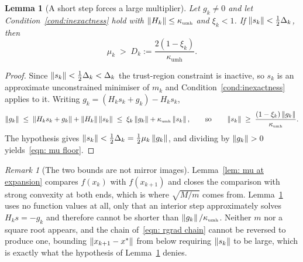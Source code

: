 \documentclass[11pt]{article}
\theoremstyle{plain}
\newtheorem{lemma}[theorem]{Lemma}
\theoremstyle{definition}
\theoremstyle{remark}
\newtheorem{remark}[theorem]{Remark}
\numberwithin{equation}{section}
\providecommand{\defeq}{\mathrel{:=}}
\newcommand*\mykappa[1]{\kappa_{\scriptscriptstyle\text{#1}}}
\begin{document}
\begin{lemma}[A short step forces a large multiplier]
\label{lem: mu at contraction}
    Let $g_k \neq 0$ and let Condition~\ref{cond:inexactness} hold with $\norm{H_k} \leq
    \mykappa{umh}$ and $\xi_k < 1$. If $\left \lVert s_k \right \rVert < \tfrac12\Delta_k$, then
    \begin{equation}
        \mu_k \;>\; D_k \defeq \frac{2(1-\xi_k)}{\mykappa{umh}} .
        \label{eqn: mu floor}
    \end{equation}
\end{lemma}

\begin{proof}
    Since $\left \lVert s_k \right \rVert < \tfrac12\Delta_k < \Delta_k$ the trust-region constraint is inactive, so
    $s_k$ is an approximate unconstrained minimiser of $m_k$ and
    Condition~\ref{cond:inexactness} applies to it. Writing
    $g_k = (H_k s_k + g_k) - H_k s_k$,
    \begin{equation*}
        \norm{g_k} \;\leq\; \norm{H_k s_k + g_k} + \norm{H_k}\norm{s_k}
                   \;\leq\; \xi_k\norm{g_k} + \mykappa{umh}\norm{s_k} ,
        \qquad\text{so}\qquad
        \norm{s_k} \;\geq\; \frac{(1-\xi_k)\norm{g_k}}{\mykappa{umh}} .
    \end{equation*}
    The hypothesis gives $\left \lVert s_k \right \rVert < \tfrac12\Delta_k = \tfrac12\mu_k\left \lVert g_k \right \rVert$, and dividing
    by $\left \lVert g_k \right \rVert > 0$ yields~\eqref{eqn: mu floor}.
\end{proof}

\begin{remark}[The two bounds are not mirror images]
\label{rem: two bounds different}
    Lemma~\ref{lem: mu at expansion} compares $f(x_k)$ with $f(x_{k+1})$ and closes the comparison
    with strong convexity at both ends, which is where $\sqrt{M/m}$ comes from.
    Lemma~\ref{lem: mu at contraction} uses no function values at all, only that an interior step
    approximately solves $H_k s = -g_k$ and therefore cannot be shorter than
    $\norm{g_k}/\mykappa{umh}$. Neither $m$ nor a square root appears, and the chain
    of~\eqref{eqn: rgrad chain} cannot be reversed to produce one, bounding
    $\left \lVert x_{k+1}-x^* \right \rVert$ from below requiring $\left \lVert s_k \right \rVert$ to be large, which is exactly what the
    hypothesis of Lemma~\ref{lem: mu at contraction} denies.
\end{remark}
\end{document}
